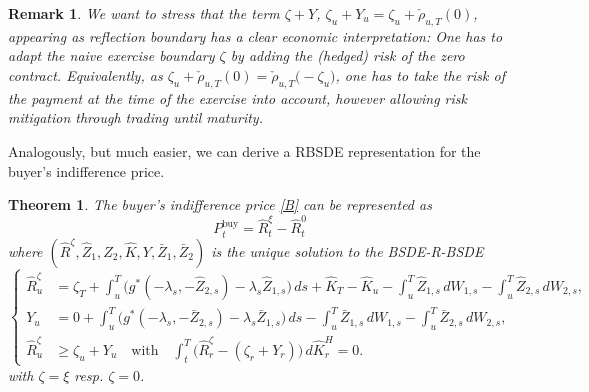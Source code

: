 \documentclass{article}
\newtheorem{remark}[definition]{Remark}
\newtheorem{theorem}[definition]{Theorem}
\begin{document}
\begin{remark}\label{rem:bdry}
	We want to stress that the term $\zeta + Y$, $\zeta_u + Y_u = \zeta_u + \check{\rho}_{u,T}(0)$, appearing as reflection boundary has a clear economic interpretation: 
	One has to adapt the naive exercise boundary $\zeta$ by adding the (hedged) risk of the zero contract. Equivalently, as
	$\zeta_u + \check{\rho}_{u,T}(0) = \check{\rho}_{u,T}\bigl(-\zeta_u\bigr)$, one has to take the risk of the payment at the time of the exercise into account, however 
	allowing risk mitigation through trading until maturity.
\end{remark}

Analogously, but much easier, we can derive a RBSDE representation for the buyer's indifference price.

\begin{theorem}\label{thm:buyprice}
	The buyer's indifference price \eqref{B} can be represented as 
	\[
		P_t^{\text{buy}} = \hat{R}^\xi_t - \hat{R}^0_t
	\]
	where $(\hat{R}^\zeta, \hat{Z}_1, \hat{Z}_2, \hat{K}, Y, \bar{Z}_1, \bar{Z}_2)$ is the unique solution to the BSDE-R-BSDE
	\[
		\left\{\begin{array}{ll}
		\hat{R}^\zeta_u &=  \zeta_T +\int_u^T \bigl(g^*(-\lambda_s, -\hat{Z}_{2,s}) - \lambda_s\hat{Z}_{1,s}\bigr) \, ds +\hat{K}_T-\hat{K}_u -
		\int_u^T\hat{Z}_{1,s} \, dW_{1,s} -\int_u^T\hat{Z}_{2,s} \, dW_{2,s}, \\
		Y_u &=  0 +\int_u^T \bigl(g^*(-\lambda_s, -\bar{Z}_{2,s}) - \lambda_s\bar{Z}_{1,s}\bigr) \, ds  -\int_u^T\bar{Z}_{1,s} \, dW_{1,s} -
		\int_u^T\bar{Z}_{2,s} \, dW_{2,s}, \\
		\hat{R}^\zeta_u &\geq   \zeta_u + Y_u  \quad \text{with} \quad \int_t^T\bigl(\hat{R}^\zeta_r  -(\zeta_r + Y_r) \bigr) \, d\hat{K}_r^H=0.
		\end{array} \right.
	\]
	with $\zeta = \xi$ resp. $\zeta = 0$.
\end{theorem}
\end{document}
